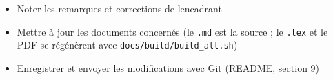 \documentclass[
  french,
  11pt,
  a4paper,
]{article}
\providecommand{\tightlist}{%
  \setlength{\itemsep}{0pt}\setlength{\parskip}{0pt}}
\begin{document}
\begin{itemize}
\tightlist
\item[$\square$]
  Noter les remarques et corrections de l\textquotesingle encadrant
\item[$\square$]
  Mettre à jour les documents concernés (le \texttt{.md} est la source ;
  le \texttt{.tex} et le PDF se régénèrent avec
  \texttt{docs/\allowbreak{}build/\allowbreak{}build\_\allowbreak{}all.\allowbreak{}sh})
\item[$\square$]
  Enregistrer et envoyer les modifications avec Git (README, section 9)
\end{itemize}
\end{document}
